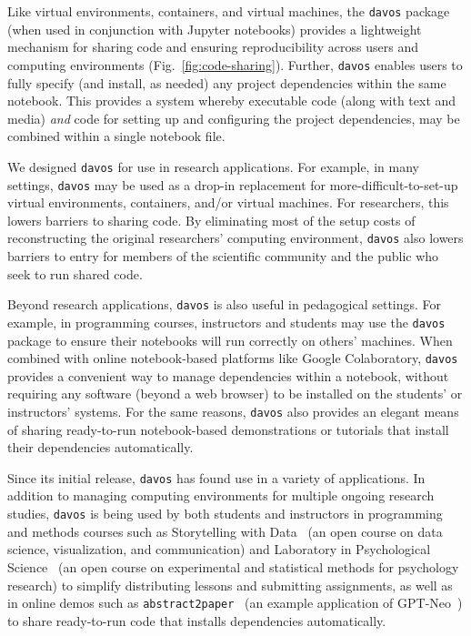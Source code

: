 \documentclass[preprint,12pt,a4paper]{elsarticle}
\begin{document}
Like virtual environments, containers, and virtual machines, the
\texttt{davos} package (when used in conjunction with Jupyter
notebooks) provides a light\-weight mechanism for sharing code and
ensuring reproducibility across users and computing environments
(Fig.~\ref{fig:code-sharing}). Further, \texttt{davos} enables users
to fully specify (and install, as needed) any project dependencies
within the same notebook. This provides a system whereby executable
code (along with text and media) \textit{and} code for setting up and
configuring the project dependencies, may be combined within a single
notebook file.

We designed \texttt{davos} for use in research applications. For
example, in many settings, \texttt{davos} may be used as a drop-in
replacement for more-difficult-to-set-up virtual environments,
containers, and/or virtual machines. For researchers, this lowers
barriers to sharing code. By eliminating most of the setup costs of
reconstructing the original researchers' computing environment,
\texttt{davos} also lowers barriers to entry for members of the
scientific community and the public who seek to run shared code.

Beyond research applications, \texttt{davos} is also useful in
pedagogical settings. For example, in programming courses, instructors
and students may use the \texttt{davos} package to ensure their
notebooks will run correctly on others' machines. When combined with
online notebook-based platforms like Google Colaboratory,
\texttt{davos} provides a convenient way to manage dependencies within
a notebook, without requiring any software (beyond a web browser) to
be installed on the students' or instructors' systems. For the same
reasons, \texttt{davos} also provides an elegant means of sharing
ready-to-run notebook-based demonstrations or tutorials that install
their dependencies automatically.

Since its initial release, \texttt{davos} has found use in a variety
of applications. In addition to managing computing environments for
multiple ongoing research studies, \texttt{davos} is being used by
both students and instructors in programming and methods courses such
as Storytelling with Data~\cite{Mann21d} (an open course on data
science, visualization, and communication) and Laboratory in
Psychological Science~\cite{Mann22} (an open course on experimental
and statistical methods for psychology research) to simplify
distributing lessons and submitting assignments, as well as in online
demos such as \texttt{abstract2paper}~\cite{Mann21e} (an example
application of GPT-Neo~\cite{GaoEtal20, BlacEtal21}) to share
ready-to-run code that installs dependencies automatically.
\end{document}

